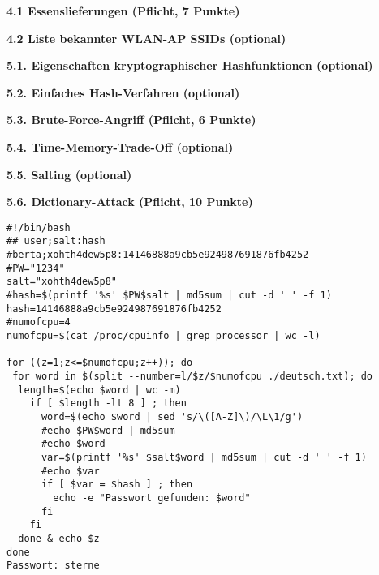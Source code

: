 \documentclass[ngerman]{fbi-aufgabenblatt}
\begin{document}
%
%
\newpage
{}

\textbf{4.1 Essenslieferungen (Pflicht, 7 Punkte)}

\textbf{4.2 Liste bekannter WLAN-AP SSIDs (optional)}


\newpage
{}

\textbf{5.1. Eigenschaften kryptographischer Hashfunktionen (optional)}

\textbf{5.2. Einfaches Hash-Verfahren (optional)}

\textbf{5.3. Brute-Force-Angriff (Pflicht, 6 Punkte)}

\textbf{5.4. Time-Memory-Trade-Off (optional)}

\textbf{5.5. Salting (optional)}

\textbf{5.6. Dictionary-Attack (Pflicht, 10 Punkte)}
\begin{verbatim}
#!/bin/bash
## user;salt:hash
#berta;xohth4dew5p8:14146888a9cb5e924987691876fb4252
#PW="1234"
salt="xohth4dew5p8"
#hash=$(printf '%s' $PW$salt | md5sum | cut -d ' ' -f 1)
hash=14146888a9cb5e924987691876fb4252
#numofcpu=4
numofcpu=$(cat /proc/cpuinfo | grep processor | wc -l)

for ((z=1;z<=$numofcpu;z++)); do
 for word in $(split --number=l/$z/$numofcpu ./deutsch.txt); do 
  length=$(echo $word | wc -m)
    if [ $length -lt 8 ] ; then
      word=$(echo $word | sed 's/\([A-Z]\)/\L\1/g')
      #echo $PW$word | md5sum
      #echo $word
      var=$(printf '%s' $salt$word | md5sum | cut -d ' ' -f 1)
      #echo $var
      if [ $var = $hash ] ; then
        echo -e "Passwort gefunden: $word"
      fi
    fi
  done & echo $z
done
Passwort: sterne
\end{verbatim}
\end{document}
